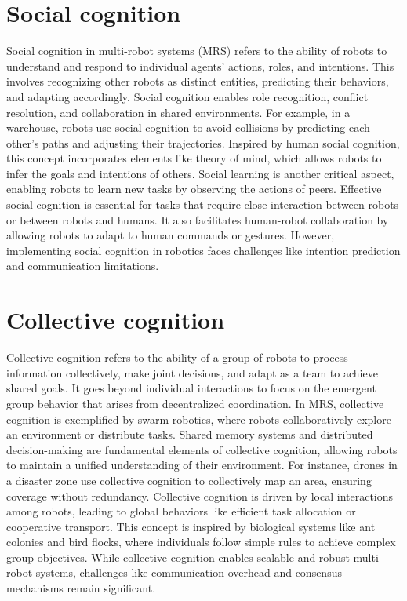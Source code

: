 \section{Social cognition}
Social cognition in multi-robot systems (MRS) refers to the ability of robots to understand and respond to individual agents’ actions, roles, and intentions. This involves recognizing other robots as distinct entities, predicting their behaviors, and adapting accordingly. Social cognition enables role recognition, conflict resolution, and collaboration in shared environments. For example, in a warehouse, robots use social cognition to avoid collisions by predicting each other’s paths and adjusting their trajectories. Inspired by human social cognition, this concept incorporates elements like theory of mind, which allows robots to infer the goals and intentions of others. Social learning is another critical aspect, enabling robots to learn new tasks by observing the actions of peers. Effective social cognition is essential for tasks that require close interaction between robots or between robots and humans. It also facilitates human-robot collaboration by allowing robots to adapt to human commands or gestures. However, implementing social cognition in robotics faces challenges like intention prediction and communication limitations. 


\section{Collective cognition}
Collective cognition refers to the ability of a group of robots to process information collectively, make joint decisions, and adapt as a team to achieve shared goals. It goes beyond individual interactions to focus on the emergent group behavior that arises from decentralized coordination. In MRS, collective cognition is exemplified by swarm robotics, where robots collaboratively explore an environment or distribute tasks. Shared memory systems and distributed decision-making are fundamental elements of collective cognition, allowing robots to maintain a unified understanding of their environment. For instance, drones in a disaster zone use collective cognition to collectively map an area, ensuring coverage without redundancy. Collective cognition is driven by local interactions among robots, leading to global behaviors like efficient task allocation or cooperative transport. This concept is inspired by biological systems like ant colonies and bird flocks, where individuals follow simple rules to achieve complex group objectives. While collective cognition enables scalable and robust multi-robot systems, challenges like communication overhead and consensus mechanisms remain significant. 


